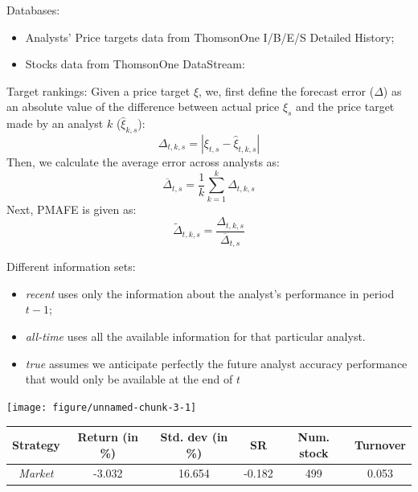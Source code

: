 \documentclass[a0paper,portrait]{baposter}\usepackage[]{graphicx}\usepackage[]{color}
\newenvironment{knitrout}{}{} %
\newcommand{\bi}{\begin{itemize}}
\newcommand{\ei}{\end{itemize}}
\newcommand{\tr}{\textit{true}}
\newcommand{\naive}{\textit{recent}}
\newcommand{\default}{\textit{all-time}}
\newcommand{\compresslist}{
	\setlength{\itemsep}{1pt}
	\setlength{\parskip}{0pt}
	\setlength{\parsep}{0pt}
}
\begin{document}
\begin{poster}
{
Databases:
\begin{itemize}
\compresslist
\item Analysts' Price targets data from ThomsonOne I/B/E/S Detailed History;
\item Stocks data from ThomsonOne DataStream:
\end{itemize}
Target rankings:
Given a  price target $\xi$, we, first define the  forecast error  ($\Delta$) as an absolute value of the difference between actual price $\xi_s$ and the price target made by an analyst $k$ ($\hat{\xi}_{k,s}$):
\begin{equation}
\Delta_{t,k,s}=|\xi_{t,s}-\hat{\xi}_{t,k,s}|
\end{equation}
Then, we calculate the average error across analysts as:
\begin{equation}
\overline{\Delta}_{t,s}=\frac{1}{k}\sum_{k=1}^k \Delta_{t,k,s}
\end{equation}
Next, PMAFE is given as:
\begin{equation}
\tilde{\Delta}_{t,k,s}=\frac{\Delta_{t,k,s}}{\overline{\Delta}_{t,s}}
\end{equation}

Different information sets:

\bi
\compresslist
\item \naive{} uses only the  information about the analyst's performance in period $t-1$;
\item \default{} uses all the available  information for that particular analyst.
\item \tr{} assumes we anticipate perfectly the future analyst accuracy performance  that would only be available at the end of $t$
\ei
}
{
\begin{center}
\begin{knitrout}
\color{fgcolor}
\texttt{[image: figure/unnamed-chunk-3-1]} 

\end{knitrout}
\end{center}
}

{
\small\addtolength{\tabcolsep}{-4pt}
\begin{center}
\begin{tabular}{cccccc}
    \toprule
Strategy&Return (in \%)&Std. dev (in \%)&SR&Num. stock&Turnover \\\midrule \textit{Market} & -3.032 & 16.654 & -0.182 &  499 & 0.053 \\ 
  

\end{tabular}
\end{center}}
\end{poster}
\end{document}
